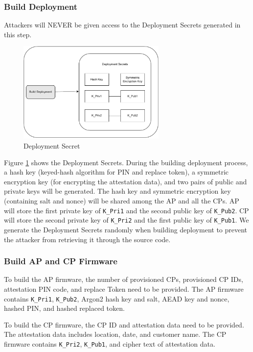 \documentclass[11pt,oneside,onecolumn,letterpaper]{article}
\newcounter{alg}
\begin{document}
	\subsubsection{Build Deployment}
	Attackers will NEVER be given access to the Deployment Secrets generated in this step.
	\begin{figure}[h]
		\centering
		\includegraphics[width=0.65\textwidth]{pics/secret.pdf}
		\caption{Deployment Secret}
		\label{fig:secret}
	\end{figure}
	
	Figure \ref{fig:secret} shows the Deployment Secrets.
	During the building deployment process,
	a hash key (keyed-hash algorithm for PIN and replace token),
	a symmetric encryption key (for encrypting the attestation data),
	and two pairs of public and private keys will be generated.
	The hash key and symmetric encryption key (containing salt and nonce) will be shared among the AP and all the CPs.
	AP will store the first private key of \texttt{K\_Pri1} and the second public key of \texttt{K\_Pub2}.
	CP will store the second private key of \texttt{K\_Pri2} and the first public key of \texttt{K\_Pub1}.
	We generate the Deployment Secrets randomly when building deployment to prevent the attacker from retrieving it through the source code.
	
	\subsubsection{Build AP and CP Firmware}
	To build the AP firmware,
	the number of provisioned CPs,
	provisioned CP IDs,
	attestation PIN code,
	and replace Token need to be provided.
	The AP firmware contains \texttt{K\_Pri1},
	\texttt{K\_Pub2},
	Argon2 hash key and salt,
	AEAD key and nonce,
	hashed PIN,
	and hashed replaced token.
	
	
	To build the CP firmware,
	the CP ID and attestation data need to be provided.
	The attestation data includes location,
	date,
	and customer name.
	The CP firmware contains \texttt{K\_Pri2},
	\texttt{K\_Pub1},
	and cipher text of attestation data.
	
\end{document}
